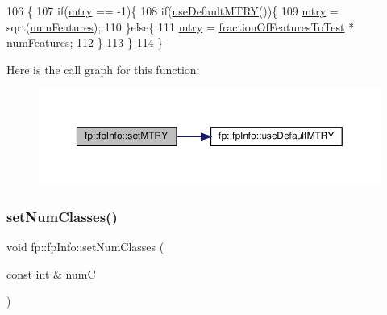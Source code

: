\begin{DoxyCode}
106                                  \{
107                 \textcolor{keywordflow}{if}(\hyperlink{classfp_1_1fpInfo_a62cccc1eb5641ebec2a6cc86cf03eedf}{mtry} == -1)\{
108                     \textcolor{keywordflow}{if}(\hyperlink{classfp_1_1fpInfo_a0a00d3d54cef667000249202a2d768bf}{useDefaultMTRY}())\{
109                         \hyperlink{classfp_1_1fpInfo_a62cccc1eb5641ebec2a6cc86cf03eedf}{mtry} = sqrt(\hyperlink{classfp_1_1fpInfo_a6ed8deabebae772fc213730cd29a2e61}{numFeatures});
110                     \}\textcolor{keywordflow}{else}\{
111                         \hyperlink{classfp_1_1fpInfo_a62cccc1eb5641ebec2a6cc86cf03eedf}{mtry} = \hyperlink{classfp_1_1fpInfo_ab949cb97523283367e9b120fd78e3c3b}{fractionOfFeaturesToTest} * 
      \hyperlink{classfp_1_1fpInfo_a6ed8deabebae772fc213730cd29a2e61}{numFeatures};
112                     \}
113                 \}
114             \}
\end{DoxyCode}
Here is the call graph for this function\+:\nopagebreak
\begin{figure}[H]
\begin{center}
\leavevmode
\includegraphics[width=350pt]{classfp_1_1fpInfo_a6b2a54fb9b3672e7b1bab3474a0ca33f_cgraph}
\end{center}
\end{figure}
\mbox{\label{classfp_1_1fpInfo_a577f80c50c60a7e48bb6ca444843cdba}} 
\subsubsection{\texorpdfstring{set\+Num\+Classes()}{setNumClasses()}}
{\footnotesize\ttfamily void fp\+::fp\+Info\+::set\+Num\+Classes (\begin{DoxyParamCaption}\item[{const int \&}]{numC }\end{DoxyParamCaption})\hspace{0.3cm}{\ttfamily [inline]}}



